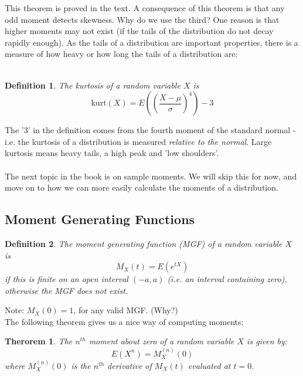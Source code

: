 \documentclass[12pt]{article} %
\newtheorem{defn}{Definition}
\newtheorem{thm}{Therorem}
\begin{document}
This theorem is proved in the text. A consequence of this theorem is that any odd moment detects skewness. Why do we use the third? One reason is that higher moments may not exist (if the tails of the distribution do not decay rapidly enough). As the tails of a distribution are important properties, there is a measure of how heavy or how long the tails of a distribution are:\\\\
\begin{defn}
The \emph{kurtosis} of a random variable $X$ is 
$$\mathrm{kurt}(X) = E\left(\left(\frac{X-\mu}{\sigma}\right)^4\right) - 3$$
\end{defn}
The '3' in the definition comes from the fourth moment of the standard normal - i.e. the kurtosis of a distribution is measured \emph{relative to the normal}. Large kurtosis means heavy tails, a high peak and 'low shoulders'. \\\\
The next topic in the book is on sample moments. We will skip this for now, and move on to how we can more easily calculate the moments of a distribution.
\subsection{Moment Generating Functions} 
\begin{defn}
The moment generating function (MGF) of a random variable $X$ is
$$M_X(t) = E(e^{tX})$$
if this is finite on an open interval $(-a,a)$ (i.e. an interval containing zero), otherwise the MGF does not exist. 
\end{defn}

Note: $M_X(0) = 1$, for any valid MGF. (Why?)\\

The following theorem gives us a nice way of computing moments:\\

\begin{thm}
The $n^{th}$ moment about zero of a random variable $X$ is given by:
$$E(X^n) = M_X^{(n)}(0)$$
where $M_X^{(n)}(0)$ is the $n^{th}$ derivative of $M_X(t)$ evaluated at $t=0$. 
\end{thm}
\end{document}
